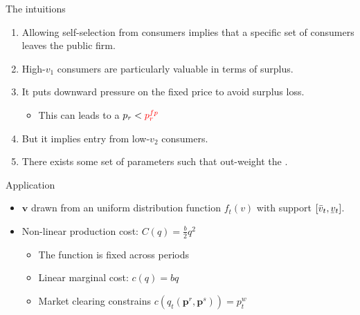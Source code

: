\documentclass{class}
\begin{document}
\begin{frame}{The intuitions}\label{WelfareComp}

\begin{enumerate}
    \item Allowing self-selection from consumers implies that a specific set of consumers leaves the public firm. \vfill
    \item High-$v_1$ consumers are particularly valuable in terms of surplus. \vfill
    \item It puts downward pressure on the fixed price to avoid surplus loss.
    \begin{itemize}
        \item This can leads to a $p_r < \textcolor{red}{p_r^{fp}}$ \vfill 
    \end{itemize}
    \item But it implies entry from low-$v_2$ consumers. \vfill 
     \item There exists some set of parameters such that  out-weight the .
\end{enumerate}
    
\end{frame}


\begin{frame}{Application}

\begin{itemize}
    \item $\textbf{v}$ drawn from an uniform distribution function $f_t(v)$ with support $[\bar{v}_t,\ubar{v}_t]$.  \vfill
    \item Non-linear production cost: $C(q) = \frac{b}{2}q^2$ \vfill
    \begin{itemize}
        \item The function is fixed across periods \vfill
        \item Linear marginal cost: $c(q) = b q$ \vfill
        \item Market clearing constrains $c(q_t(\textbf{p}^r,\textbf{p}^s)) = p_t^w $\vfill

\end{itemize}


\end{itemize}

    
\end{frame}
\end{document}
